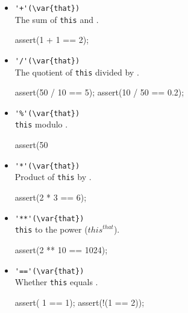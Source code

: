 \begin{itemize}
\item \lstinline|'+'(\var{that})|\\
  The sum of \lstinline|this| and .
\begin{urbiscript}[firstnumber=last]
assert(1 + 1 == 2);
\end{urbiscript}

\item \lstinline|'/'(\var{that})|\\
  The quotient of \lstinline|this| divided by .
\begin{urbiscript}[firstnumber=last]
assert(50 / 10 == 5);
assert(10 / 50 == 0.2);
\end{urbiscript}

\item \lstinline|'%'(\var{that})|\\
  \lstinline|this| modulo .
\begin{urbiscript}[firstnumber=last]
assert(50 %
\end{urbiscript}

\item \lstinline|'*'(\var{that})|\\
  Product of \lstinline|this| by .
\begin{urbiscript}[firstnumber=last]
assert(2 * 3 == 6);
\end{urbiscript}

\item \lstinline|'**'(\var{that})|\\
  \lstinline|this| to the  power (${this}^{that}$).
\begin{urbiscript}[firstnumber=last]
assert(2 ** 10 == 1024);
\end{urbiscript}

\item \lstinline|'=='(\var{that})|\\
  Whether \lstinline|this| equals .
\begin{urbiscript}[firstnumber=last]
assert(  1 == 1);
assert(!(1 == 2));
\end{urbiscript}
\end{itemize}


